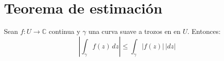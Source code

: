 \documentclass[spanish,presentation]{beamer}
\begin{document}
\section{Teorema de estimación}
\label{sec-3}

\begin{frame}[label=sec-3-1]{}
\begin{theorem}
Sean \(f\colon U\to \mathbb{C}\) continua y \(\gamma\) una curva
suave a trozos en en \(U\). Entonces:
\begin{displaymath}
\left|\int_{\gamma}f(z)\,dz\right|\leq \int_{\gamma}|f(z)|\,|dz|
\end{displaymath}
\end{theorem}
\end{frame}
\end{document}
